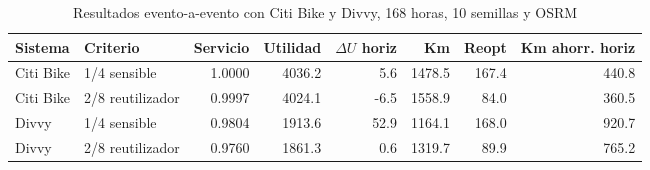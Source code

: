 \begin{table}[htbp]
\centering
\footnotesize
\caption{Resultados evento-a-evento con Citi Bike y Divvy, 168 horas, 10 semillas y OSRM}
\label{tab:realbike-event-replay}
\begin{tabular}{llrrrrrr}
\hline
Sistema & Criterio & Servicio & Utilidad & $\Delta U$ horiz& Km & Reopt& Km ahorr. horiz\\
\hline
Citi Bike & 1/4 sensible & 1.0000 & 4036.2 & 5.6 & 1478.5 & 167.4 & 440.8 \\
Citi Bike & 2/8 reutilizador & 0.9997 & 4024.1 & -6.5 & 1558.9 & 84.0 & 360.5 \\
Divvy & 1/4 sensible & 0.9804 & 1913.6 & 52.9 & 1164.1 & 168.0 & 920.7 \\
Divvy & 2/8 reutilizador & 0.9760 & 1861.3 & 0.6 & 1319.7 & 89.9 & 765.2 \\
\hline
\end{tabular}
\end{table}
